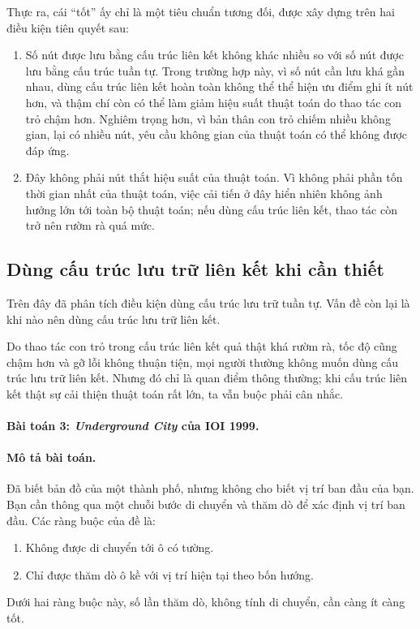 \documentclass[11pt]{article}
\begin{document}
Thực ra, cái ``tốt'' ấy chỉ là một tiêu chuẩn tương đối, được xây dựng trên
hai điều kiện tiên quyết sau:
\begin{enumerate}
  \item Số nút được lưu bằng cấu trúc liên kết không khác nhiều so với số nút
  được lưu bằng cấu trúc tuần tự. Trong trường hợp này, vì số nút cần lưu khá
  gần nhau, dùng cấu trúc liên kết hoàn toàn không thể thể hiện ưu điểm ghi ít
  nút hơn, và thậm chí còn có thể làm giảm hiệu suất thuật toán do thao tác
  con trỏ chậm hơn. Nghiêm trọng hơn, vì bản thân con trỏ chiếm nhiều không
  gian, lại có nhiều nút, yêu cầu không gian của thuật toán có thể không được
  đáp ứng.
  \item Đây không phải nút thắt hiệu suất của thuật toán. Vì không phải phần
  tốn thời gian nhất của thuật toán, việc cải tiến ở đây hiển nhiên không ảnh
  hưởng lớn tới toàn bộ thuật toán; nếu dùng cấu trúc liên kết, thao tác còn
  trở nên rườm rà quá mức.
\end{enumerate}

\subsection{Dùng cấu trúc lưu trữ liên kết khi cần thiết}

Trên đây đã phân tích điều kiện dùng cấu trúc lưu trữ tuần tự. Vấn đề còn lại
là khi nào nên dùng cấu trúc lưu trữ liên kết.

Do thao tác con trỏ trong cấu trúc liên kết quả thật khá rườm rà, tốc độ cũng
chậm hơn và gỡ lỗi không thuận tiện, mọi người thường không muốn dùng cấu
trúc lưu trữ liên kết. Nhưng đó chỉ là quan điểm thông thường; khi cấu trúc
liên kết thật sự cải thiện thuật toán rất lớn, ta vẫn buộc phải cân nhắc.

\paragraph{Bài toán 3: \textit{Underground City} của IOI 1999.}

\paragraph{Mô tả bài toán.}
Đã biết bản đồ của một thành phố, nhưng không cho biết vị trí ban đầu của
bạn. Bạn cần thông qua một chuỗi bước di chuyển và thăm dò để xác định vị trí
ban đầu. Các ràng buộc của đề là:
\begin{enumerate}
  \item Không được di chuyển tới ô có tường.
  \item Chỉ được thăm dò ô kề với vị trí hiện tại theo bốn hướng.
\end{enumerate}
Dưới hai ràng buộc này, số lần thăm dò, không tính di chuyển, cần càng ít
càng tốt.
\end{document}
